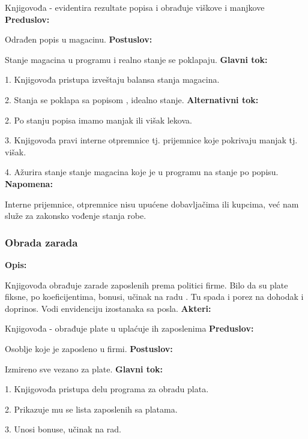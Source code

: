 Knjigovođa - evidentira rezultate popisa i obrađuje viškove i manjkove
\newline
\textbf{Preduslov:}

Odrađen popis u magacinu.
\newline
\textbf{Postuslov:}

Stanje magacina u programu i realno stanje se poklapaju.
\newline
\textbf{Glavni tok:}

1. Knjigovođa pristupa izveštaju balansa stanja magacina.

2. Stanja se poklapa sa popisom , idealno stanje.
\newline
\textbf{Alternativni tok:}

2. Po stanju popisa imamo manjak ili višak lekova.

3. Knjigovođa pravi interne otpremnice tj. prijemnice koje pokrivaju manjak tj. višak.

4. Ažurira stanje stanje magacina koje je u programu na stanje po popisu.
\newline
\textbf{Napomena:}

Interne prijemnice, otpremnice nisu upućene dobavljačima ili kupcima, već nam služe za zakonsko vođenje stanja robe.

\clearpage

\subsubsection{Obrada zarada}

\textbf{Opis:}

Knjigovođa obrađuje zarade zaposlenih prema politici firme. Bilo da su plate fiksne, po koeficijentima, bonusi, učinak na radu . Tu spada i porez na dohodak i doprinos. Vodi envidenciju izostanaka sa posla.
\newline
\textbf{Akteri:}

Knjigovođa - obrađuje plate u uplaćuje ih zaposlenima
\newline
\textbf{Preduslov:}

Osoblje koje je zaposleno u firmi.
\newline
\textbf{Postuslov:}

Izmireno sve vezano za plate.
\newline
\textbf{Glavni tok:}

1. Knjigovođa pristupa delu programa za obradu plata.

2. Prikazuje mu se lista zaposlenih sa platama.

3. Unosi bonuse, učinak na rad.

